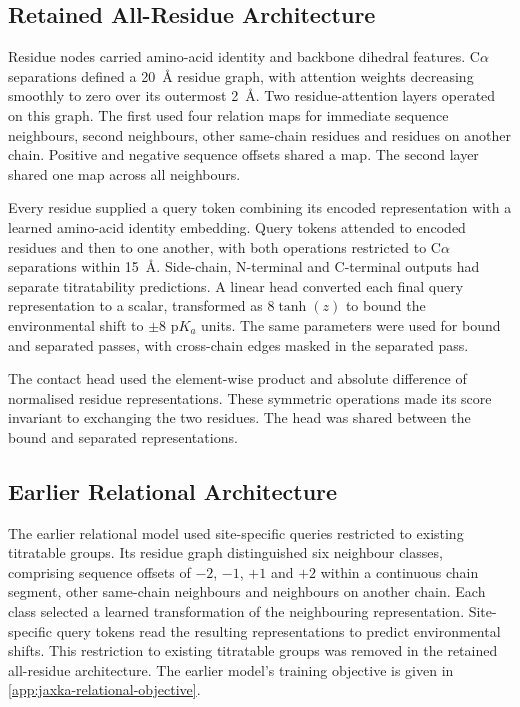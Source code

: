 \subsection{Retained All-Residue Architecture}
\label{app:jaxka-architecture}

Residue nodes carried amino-acid identity and backbone dihedral features. C$\alpha$ separations defined a 20~\AA{} residue graph, with attention weights decreasing smoothly to zero over its outermost 2~\AA{}. Two residue-attention layers operated on this graph. The first used four relation maps for immediate sequence neighbours, second neighbours, other same-chain residues and residues on another chain. Positive and negative sequence offsets shared a map. The second layer shared one map across all neighbours.

Every residue supplied a query token combining its encoded representation with a learned amino-acid identity embedding. Query tokens attended to encoded residues and then to one another, with both operations restricted to C$\alpha$ separations within 15~\AA{}. Side-chain, N-terminal and C-terminal outputs had separate titratability predictions. A linear head converted each final query representation to a scalar, transformed as $8\tanh(z)$ to bound the environmental shift to $\pm8$ $\mathrm{p}K_a$ units. The same parameters were used for bound and separated passes, with cross-chain edges masked in the separated pass.

The contact head used the element-wise product and absolute difference of normalised residue representations. These symmetric operations made its score invariant to exchanging the two residues. The head was shared between the bound and separated representations.

\subsection{Earlier Relational Architecture}
\label{app:jaxka-relational-architecture}

The earlier relational model used site-specific queries restricted to existing titratable groups. Its residue graph distinguished six neighbour classes, comprising sequence offsets of $-2$, $-1$, $+1$ and $+2$ within a continuous chain segment, other same-chain neighbours and neighbours on another chain. Each class selected a learned transformation of the neighbouring representation. Site-specific query tokens read the resulting representations to predict environmental shifts. This restriction to existing titratable groups was removed in the retained all-residue architecture. The earlier model's training objective is given in \cref{app:jaxka-relational-objective}.

